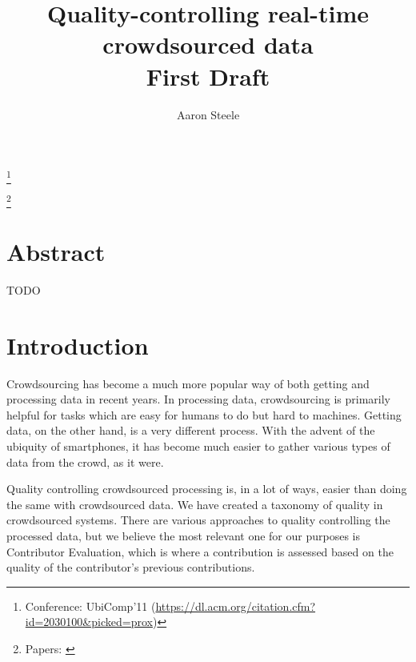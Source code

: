 \documentclass[10pt,twocolumn]{article}
\title{Quality-controlling real-time crowdsourced data \\ \large First Draft}
\author{Aaron Steele}
\date{}
\newcommand\blfootnote[1]{%
	\begingroup
	\renewcommand\thefootnote{}\footnote{#1}%
	\addtocounter{footnote}{-1}%
	\endgroup
}
\begin{document}
	\maketitle
	
	\blfootnote{Conference: UbiComp'11 (\url{https://dl.acm.org/citation.cfm?id=2030100&picked=prox}) }
	\blfootnote{Papers: \cite{UB-QC-CC}\cite{QC-CC}}
	
	
	\section*{Abstract}
	    TODO
	\section*{Introduction}
	    Crowdsourcing has become a much more popular way of both getting and processing data in recent years. In processing data, crowdsourcing is primarily helpful for tasks which are easy for humans to do but hard to machines. %
	    Getting data, on the other hand, is a very different process. With the advent of the ubiquity of smartphones, it has become much easier to gather various types of data from the crowd, as it were.
	    
	    Quality controlling crowdsourced processing is, in a lot of ways, easier than doing the same with crowdsourced data. We have created a taxonomy of quality in crowdsourced systems. There are various approaches to quality controlling the processed data, but we believe the most relevant one for our purposes is Contributor Evaluation, which is where a contribution is assessed based on the quality of the contributor's previous contributions. 
	    
\end{document}
